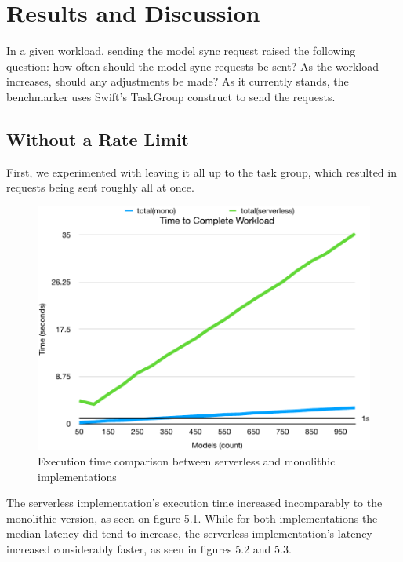 \section{Results and Discussion}
In a given workload, sending the model sync request raised the following question: how often should the model sync requests be sent? As the workload increases, should any adjustments be made? As it currently stands, the benchmarker uses Swift's TaskGroup construct to send the requests.
\subsection{Without a Rate Limit}
First, we experimented with leaving it all up to the task group, which resulted in requests being sent roughly all at once. 
\begin{figure}[h!]
    \centering
    \includegraphics[width=\textwidth]{media/no_rl_ex.pdf}
    \caption{Execution time comparison between serverless and monolithic implementations}
    \label{fig:rate_unlimited_comparison}
\end{figure}
The serverless implementation's execution time increased incomparably to the monolithic version, as seen on figure 5.1.
While for both implementations the median latency did tend to increase, the serverless implementation's latency increased considerably faster, as seen in figures 5.2 and 5.3.
